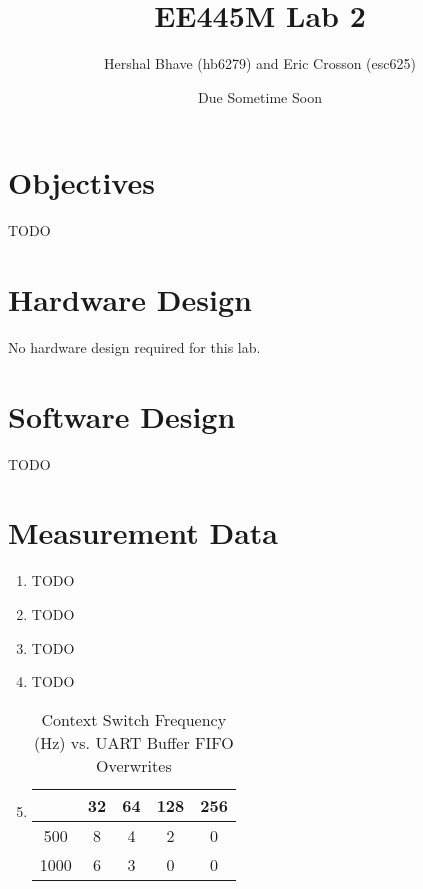 \documentclass[12pt]{article}
\title{EE445M Lab 2}
\author{Hershal Bhave (hb6279) and Eric Crosson (esc625)}
\date{Due Sometime Soon}
\begin{document}
\maketitle

\section{Objectives}
{\huge \color{red} TODO}

\section{Hardware Design}
No hardware design required for this lab.

\section{Software Design}
{\huge \color{red} TODO}

\section{Measurement Data}
\begin{enumerate}
\item {\huge \color{red} TODO}
\item {\huge \color{red} TODO}
\item {\huge \color{red} TODO}
\item {\huge \color{red} TODO}
\item
  \begin{table}[h]
    \centering
    \begin{tabular}[H]{c|c|c|c|c}
           & 32 & 64 & 128 & 256 \\ \hline
      500  & 8  & 4  & 2   & 0   \\ \hline
      1000 & 6  & 3  & 0   & 0   \\ \hline
    \end{tabular}
    \caption{Context Switch Frequency (Hz) vs. UART Buffer FIFO Overwrites}
    \label{tab:fifo-perf}
  \end{table}

\end{enumerate}
\end{document}
